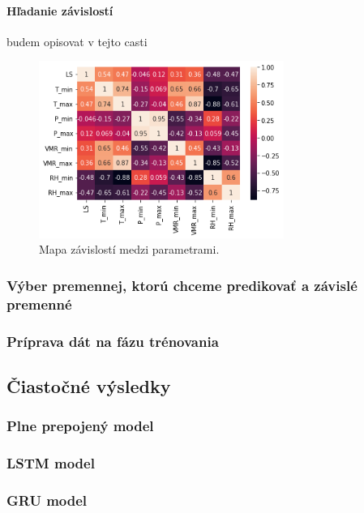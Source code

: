 \paragraph{Hľadanie závislostí} budem opisovat v tejto casti
\begin{figure}[!htbp]
  \centering
  \includegraphics[width=8cm]{img/heatmap.png}
  \caption{Mapa závislostí medzi parametrami.}
  \label{heatmap}
\end{figure}




\newpage

\subsubsection{Výber premennej, ktorú chceme predikovať a závislé premenné}
\subsubsection{Príprava dát na fázu trénovania}

\subsection{Čiastočné výsledky}

\subsubsection{Plne prepojený model} 
\subsubsection{LSTM model} 
\subsubsection{GRU model} 

